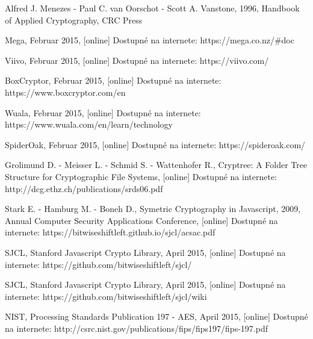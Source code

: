 \documentclass[12pt, oneside]{book}
\begin{document}
\begin{thebibliography}{1}

 Alfred J. Menezes - Paul C. van Oorschot - Scott A. Vanstone, 1996, Handbook of Applied Cryptography, CRC Press

 Mega, Februar 2015,  [online] Dostupné na internete: https://mega.co.nz/\#doc

 Viivo, Februar 2015,  [online] Dostupné na internete: https://viivo.com/

 BoxCryptor, Februar 2015,  [online] Dostupné na internete: https://www.boxcryptor.com/en

 Wuala, Februar 2015, [online] Dostupné na internete: https://www.wuala.com/en/learn/technology

 SpiderOak, Februar 2015,  [online] Dostupné na internete: https://spideroak.com/

 Grolimund D. - Meisser L. - Schmid S. - Wattenhofer R., Cryptree: A Folder Tree Structure for Cryptographic File Systems, [online] Dostupné na internete: http://dcg.ethz.ch/publications/srds06.pdf
 
 Stark E. - Hamburg M. - Boneh D., Symetric Cryptography in Javascript, 2009, Annual Computer Security Applications Conference,  [online]  Dostupné na internete: https://bitwiseshiftleft.github.io/sjcl/acsac.pdf

 SJCL, Stanford Javascript Crypto Library, April 2015,  [online]  Dostupné na internete: https://github.com/bitwiseshiftleft/sjcl/

 SJCL, Stanford Javascript Crypto Library, April 2015,  [online]  Dostupné na internete: https://github.com/bitwiseshiftleft/sjcl/wiki

 NIST, Processing Standards Publication 197 - AES, April 2015,  [online]  Dostupné na internete: http://csrc.nist.gov/publications/fips/fips197/fips-197.pdf






\end{thebibliography}
\end{document}
